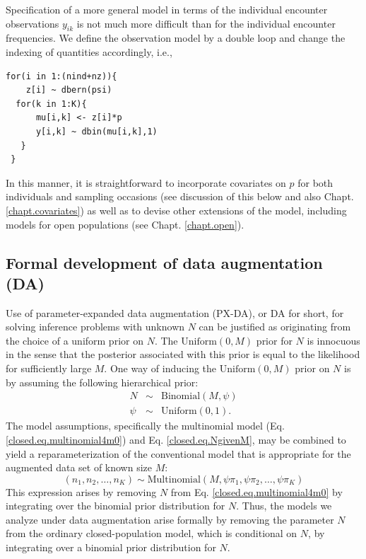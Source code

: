 Specification of a more general model in terms of the individual
encounter observations $y_{ik}$ is not much more difficult than for
the individual encounter frequencies.  We define the
observation model by a double loop and change the indexing of quantities
accordingly, i.e.,
{\small
\begin{verbatim}
for(i in 1:(nind+nz)){
    z[i] ~ dbern(psi)
  for(k in 1:K){
      mu[i,k] <- z[i]*p
      y[i,k] ~ dbin(mu[i,k],1)
   }
 }
\end{verbatim}
}
In this manner, it is straightforward to incorporate covariates on $p$
for both individuals and sampling occasions
(see discussion of this below and also Chapt. \ref{chapt.covariates})
as well as to devise other extensions of the model, including models
for open populations (see Chapt. \ref{chapt.open}).

\subsection{Formal development of data augmentation (DA) }

Use of parameter-expanded data augmentation (PX-DA), or DA for short, for solving inference problems with unknown $N$ can be
justified as originating from the choice of a uniform prior on $N$.  The
$\mathrm{Uniform}(0,M)$ prior for $N$ is innocuous in the sense that the
posterior associated with this prior is equal to the likelihood for
sufficiently large $M$.  One way of inducing the $\mathrm{Uniform}(0,M)$
prior on $N$ is by assuming the following hierarchical prior:
\begin{eqnarray}
\label{closed.eq.NgivenM}
  N &\sim& \mathrm{Binomial}(M, \psi) \\ \nonumber
  \psi &\sim& \mathrm{Uniform}(0,1).
\end{eqnarray}
The model assumptions, specifically the multinomial model
(Eq. \ref{closed.eq.multinomial4m0})
and Eq. \ref{closed.eq.NgivenM}, may be combined to yield a
reparameterization of the conventional model that is appropriate for
the augmented data set of known size $M$:
\begin{equation}
\label{closed.eq.multinomial4DA}
    (n_1, n_2, \ldots, n_K) \sim \mathrm{Multinomial}(M, \psi  \pi_{1}, \psi \pi_{2}, \ldots, \psi \pi_{K})
\end{equation}
This expression arises by removing $N$ from Eq. \ref{closed.eq.multinomial4m0} by
integrating
over the binomial prior distribution for $N$. Thus, the models we
analyze under data augmentation arise formally by removing the
parameter $N$ from the ordinary closed-population model, which is 
conditional on $N$, by integrating over a binomial prior distribution
for $N$.

